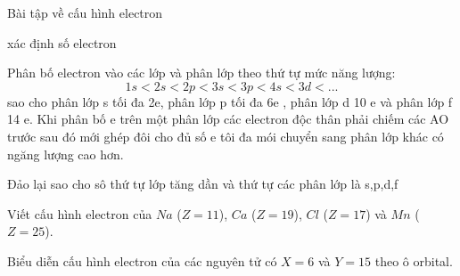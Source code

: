 \begin{dang}{Bài tập về cấu hình electron}\end{dang}
\begin{pp}
	\begin{cacbuoc}
		\item xác định số electron
		\item Phân bố electron vào các lớp và phân lớp theo thứ tự mức năng lượng:
		\[1s<2s<2p<3s<3p<4s<3d<...\] sao cho phân lớp s tối đa 2e, phân lớp p tối đa 6e , phân lớp d 10 e và phân lớp f 14 e. Khi phân bố e trên một phân lớp các electron độc thân phải chiếm các AO trước sau đó mới ghép đôi cho đủ số e tôi đa mói chuyển sang phân lớp khác có ngăng lượng cao hơn.
		\item Đảo lại  sao cho sô thứ tự lớp tăng dần và thứ tự các phân lớp là s,p,d,f
	\end{cacbuoc}
\end{pp}
\begin{vdex}
	Viết cấu hình electron của $Na$ ($Z=11$), $Ca$ ($Z=19$), $Cl$ ($Z=17$) và $Mn$ ($Z=25$).
\end{vdex}
\begin{vdex}
	Biểu diễn cấu hình electron của các nguyên tử có $X=6$ và $Y=15$ theo ô orbital.
\end{vdex}

